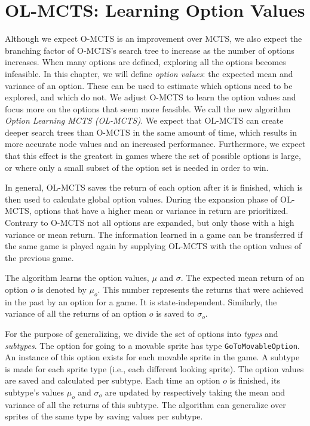\section{OL-MCTS: Learning Option Values} 
\label{sec:learning} 
Although we expect O-MCTS is an improvement over MCTS, we also expect the
branching factor of O-MCTS's search tree to increase as the number of options
increases.  When many options are defined, exploring all the options becomes
infeasible. In this chapter, we will define \emph{option values}: the expected
mean and variance of an option. These can be used to estimate which options need
to be explored, and which do not. We adjust O-MCTS to learn the option values
and focus more on the options that seem more feasible. We call the new algorithm
\emph{Option Learning MCTS (OL-MCTS)}. We expect that OL-MCTS can create deeper
search trees than O-MCTS in the same amount of time, which results in more
accurate node values and an increased performance. Furthermore, we expect that
this effect is the greatest in games where the set of possible options is large,
or where only a small subset of the option set is needed in order to win.

In general, OL-MCTS saves the return of each option after it is finished, which
is then used to calculate global option values. During the expansion phase of
OL-MCTS, options that have a higher mean or variance in return are prioritized.
Contrary to O-MCTS not all options are expanded, but only those with a high
variance or mean return. The information learned in a game can be transferred if
the same game is played again by supplying OL-MCTS with the option values of the
previous game.

The algorithm learns the option values, $\mu$ and $\sigma$. The expected mean
return of an option $o$ is denoted by $\mu_o$. This number represents the
returns that were achieved in the past by an option for a game. It is
state-independent. Similarly, the variance of all the returns of an option $o$
is saved to $\sigma_o$.

For the purpose of generalizing, we divide the set of options into \emph{types}
and \emph{subtypes}. The option for going to a movable sprite has type
\texttt{GoToMovableOption}. An instance of this option exists for each movable
sprite in the game. A subtype is made for each sprite type (i.e., each
different looking sprite). The option values are saved and calculated per
subtype. Each time an option $o$ is finished, its subtype's values $\mu_o$ and
$\sigma_o$ are updated by respectively taking the mean and variance of all the
returns of this subtype. The algorithm can generalize over sprites of the same
type by saving values per subtype.

